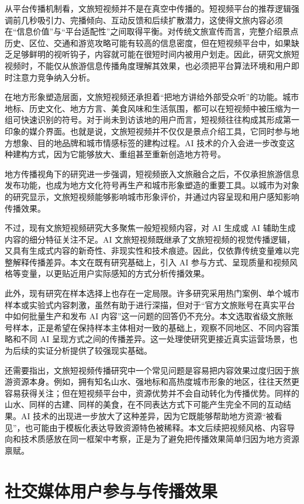 从平台传播机制看，文旅短视频并不是在真空中传播的。短视频平台的推荐逻辑强调前几秒吸引力、完播倾向、互动反馈和后续扩散潜力，这使得文旅内容必须在“信息价值”与“平台适配性”之间取得平衡。对传统文旅宣传而言，完整介绍景点历史、区位、交通和游览攻略可能有较高的信息密度，但在短视频平台中，如果缺乏足够鲜明的视听钩子，内容就可能在很短时间内被用户划走。因此，研究文旅短视频时，不能仅从旅游信息传播角度理解其效果，也必须把平台算法环境和用户即时注意力竞争纳入分析。

在地方形象塑造层面，文旅短视频还承担着“把地方讲给外部受众听”的功能。城市地标、历史文化、地方方言、美食风味和生活氛围，都可以在短视频中被压缩为一组可快速识别的符号。对于尚未到访该地的用户而言，短视频往往构成其形成第一印象的媒介界面。也就是说，文旅短视频并不仅仅是景点介绍工具，它同时参与地方想象、目的地品牌和城市情感标签的建构过程。AI 技术的介入会进一步改变这种建构方式，因为它能够放大、重组甚至重新创造地方符号。

地方传播视角下的研究进一步强调，短视频嵌入文旅融合之后，不仅承担旅游信息发布功能，也成为地方文化符号再生产和城市形象塑造的重要工具\cite{lit09}。以城市为对象的研究显示，文旅短视频能够影响城市形象评价，并通过内容呈现和用户感知影响传播效果\cite{lit10}。

不过，现有文旅短视频研究大多聚焦一般短视频内容，对 AI 生成或 AI 辅助生成内容的细分特征关注不足。AI 文旅短视频既继承了文旅短视频的视觉传播逻辑，又具有生成式内容的新奇性、非现实性和技术痕迹。因此，仅依靠传统变量难以完整解释传播差异。本文在既有研究基础上，引入 AI 参与方式、呈现质量和视频风格等变量，以更贴近用户实际感知的方式分析传播效果。

此外，现有研究在样本选择上也存在一定局限。许多研究采用热门案例、单个城市样本或实验式内容刺激，虽然有助于进行深描，但对于“官方文旅账号在真实平台中如何批量生产和发布 AI 内容”这一问题的回答仍不充分。本文选取省级文旅账号样本，正是希望在保持样本主体相对一致的基础上，观察不同地区、不同内容策略和不同 AI 呈现方式之间的传播差异。这一处理使研究更接近真实运营场景，也为后续的实证分析提供了较强现实基础。

还需要指出，文旅短视频传播研究中一个常见问题是容易把内容效果过度归因于旅游资源本身。例如，拥有知名山水、强地标和高热度城市形象的地区，往往天然更容易获得关注；但在短视频平台中，资源优势并不会自动转化为传播优势。同样的山水、同样的古建、同样的美食，在不同表达方式下可能产生完全不同的互动结果。AI 技术的出现进一步放大了这种差异，因为它既能够帮助地方资源“被看见”，也可能由于模板化表达导致资源特色被稀释。本文后续把视频风格、内容导向和技术质感放在同一框架中考察，正是为了避免把传播效果简单归因为地方资源禀赋。

\section{社交媒体用户参与与传播效果}

